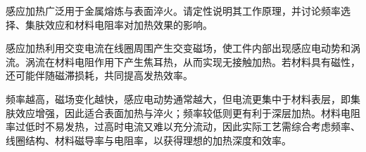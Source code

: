 \begin{problem}
感应加热广泛用于金属熔炼与表面淬火。请定性说明其工作原理，并讨论频率选择、集肤效应和材料电阻率对加热效果的影响。

\begin{solution}
感应加热利用交变电流在线圈周围产生交变磁场，使工件内部出现感应电动势和涡流。涡流在材料电阻作用下产生焦耳热，从而实现无接触加热。若材料具有磁性，还可能伴随磁滞损耗，共同提高发热效率。

频率越高，磁场变化越快，感应电动势通常越大，但电流更集中于材料表层，即集肤效应增强，因此适合表面加热与淬火；频率较低则更有利于深层加热。材料电阻率过低时不易发热，过高时电流又难以充分流动，因此实际工艺需综合考虑频率、线圈结构、材料磁导率与电阻率，以获得理想的加热深度和效率。
\end{solution}
\end{problem}
